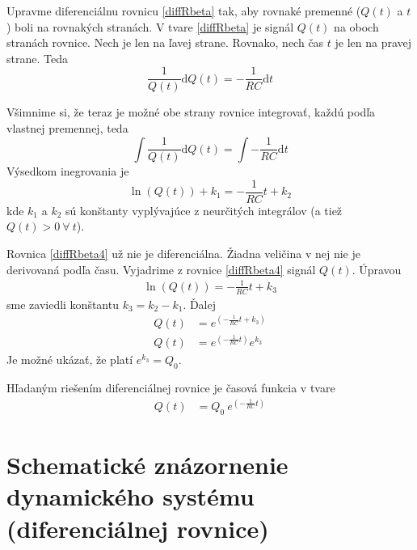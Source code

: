\documentclass[a4paper, 10pt, ]{article}
\begin{document}
Upravme diferenciálnu rovnicu \eqref{diffRbeta} tak, aby rovnaké premenné ($Q(t)$ a $t$) boli na rovnakých stranách. V tvare \eqref{diffRbeta} je signál $Q(t)$ na oboch stranách rovnice. Nech je len na ľavej strane. Rovnako, nech čas $t$ je len na pravej strane. Teda
\begin{equation} \label{diffRbeta2}
    \frac{1}{Q(t)}\text{d}Q(t) = - \frac{1}{RC} \text{d}t
\end{equation}

Všimnime si, že teraz je možné obe strany rovnice integrovať, každú podľa vlastnej premennej, teda
\begin{equation} \label{diffRbeta3}
    \int \frac{1}{Q(t)}\text{d}Q(t) =  \int - \frac{1}{RC} \text{d}t
\end{equation}
Výsedkom inegrovania je
\begin{equation} \label{diffRbeta4}
     \ln \left(  Q(t)  \right) + k_1 =   - \frac{1}{RC} t + k_2
\end{equation}
kde $k_1$ a $k_2$ sú konštanty vyplývajúce z neurčitých integrálov (a tiež $Q(t)>0 \ \forall \ t$).

Rovnica \eqref{diffRbeta4} už nie je diferenciálna. Žiadna veličina v nej nie je derivovaná podľa času. Vyjadrime z rovnice \eqref{diffRbeta4} signál $Q(t)$. Úpravou
\begin{align}
    \ln \left(  Q(t)  \right)  =   - \frac{1}{RC} t + k_3
\end{align}
sme zaviedli konštantu $k_3 = k_2 - k_1$. Ďalej
\begin{subequations}
    \begin{align}
        Q(t)   &=  e^{\left( - \frac{1}{RC} t + k_3 \right)} \\
        Q(t)   &=  e^{\left( - \frac{1}{RC} t \right)}  e^{k_3} \label{rawRies}
    \end{align}
\end{subequations}
Je možné ukázať, že platí $e^{k_3} = Q_0$.

Hľadaným riešením diferenciálnej rovnice je časová funkcia v tvare
\begin{align}
    Q(t)   &=  Q_0 \ e^{\left( - \frac{1}{RC} t \right)}   \label{rawRies2}
\end{align}









\section[Schematické znázornenie dynamického systému]{Schematické znázornenie dynamického systému\\ (diferenciálnej rovnice)}
\end{document}

